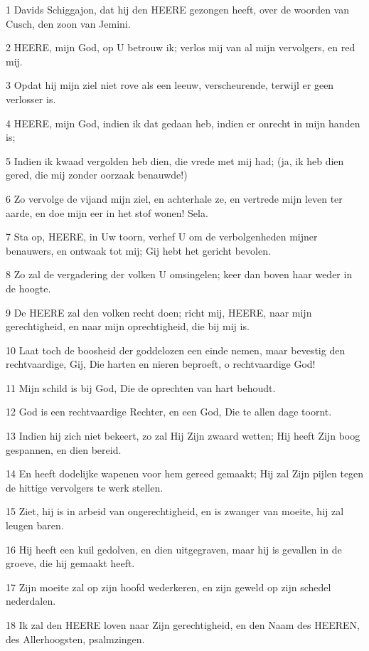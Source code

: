 \par 1 Davids Schiggajon, dat hij den HEERE gezongen heeft, over de woorden van Cusch, den zoon van Jemini.
\par 2 HEERE, mijn God, op U betrouw ik; verlos mij van al mijn vervolgers, en red mij.
\par 3 Opdat hij mijn ziel niet rove als een leeuw, verscheurende, terwijl er geen verlosser is.
\par 4 HEERE, mijn God, indien ik dat gedaan heb, indien er onrecht in mijn handen is;
\par 5 Indien ik kwaad vergolden heb dien, die vrede met mij had; (ja, ik heb dien gered, die mij zonder oorzaak benauwde!)
\par 6 Zo vervolge de vijand mijn ziel, en achterhale ze, en vertrede mijn leven ter aarde, en doe mijn eer in het stof wonen! Sela.
\par 7 Sta op, HEERE, in Uw toorn, verhef U om de verbolgenheden mijner benauwers, en ontwaak tot mij; Gij hebt het gericht bevolen.
\par 8 Zo zal de vergadering der volken U omsingelen; keer dan boven haar weder in de hoogte.
\par 9 De HEERE zal den volken recht doen; richt mij, HEERE, naar mijn gerechtigheid, en naar mijn oprechtigheid, die bij mij is.
\par 10 Laat toch de boosheid der goddelozen een einde nemen, maar bevestig den rechtvaardige, Gij, Die harten en nieren beproeft, o rechtvaardige God!
\par 11 Mijn schild is bij God, Die de oprechten van hart behoudt.
\par 12 God is een rechtvaardige Rechter, en een God, Die te allen dage toornt.
\par 13 Indien hij zich niet bekeert, zo zal Hij Zijn zwaard wetten; Hij heeft Zijn boog gespannen, en dien bereid.
\par 14 En heeft dodelijke wapenen voor hem gereed gemaakt; Hij zal Zijn pijlen tegen de hittige vervolgers te werk stellen.
\par 15 Ziet, hij is in arbeid van ongerechtigheid, en is zwanger van moeite, hij zal leugen baren.
\par 16 Hij heeft een kuil gedolven, en dien uitgegraven, maar hij is gevallen in de groeve, die hij gemaakt heeft.
\par 17 Zijn moeite zal op zijn hoofd wederkeren, en zijn geweld op zijn schedel nederdalen.
\par 18 Ik zal den HEERE loven naar Zijn gerechtigheid, en den Naam des HEEREN, des Allerhoogsten, psalmzingen.

